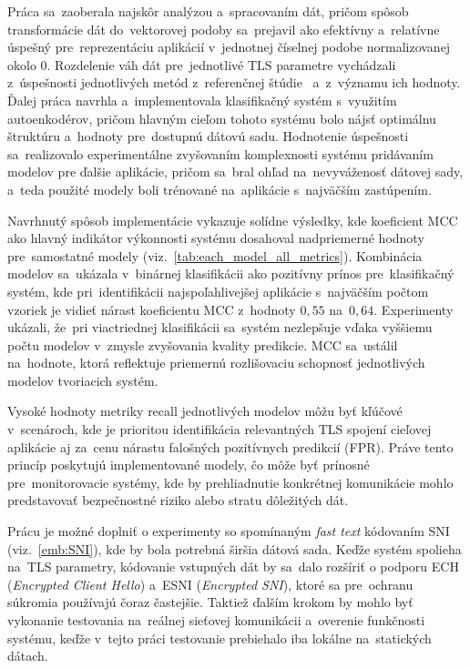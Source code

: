 Práca sa~zaoberala najskôr analýzou a~spracovaním dát, pričom spôsob transformácie dát do~vektorovej podoby sa~prejavil ako efektívny a~relatívne úspešný pre~reprezentáciu aplikácií v~jednotnej číselnej podobe normalizovanej okolo 0. Rozdelenie váh dát pre~jednotlivé TLS parametre vychádzali z~úspešnosti jednotlivých metód z~referenčnej štúdie~\cite{app_identification} a~z~významu ich hodnoty. Ďalej práca navrhla a~implementovala klasifikačný systém s~využitím autoenkodérov, pričom hlavným cieľom tohoto systému bolo nájsť optimálnu štruktúru a~hodnoty pre~dostupnú dátovú sadu. Hodnotenie úspešnosti sa~realizovalo experimentálne zvyšovaním komplexnosti systému pridávaním modelov pre ďalšie aplikácie, pričom sa~bral ohľad na~nevyváženosť dátovej sady, a~teda použité modely boli trénované na~aplikácie s~najväčším zastúpením. 

Navrhnutý spôsob implementácie vykazuje solídne výsledky, kde koeficient MCC ako hlavný indikátor výkonnosti systému dosahoval nadpriemerné hodnoty pre~samostatné modely (viz.~\ref{tab:each_model_all_metrics}). Kombinácia modelov sa~ukázala v~binárnej klasifikácii ako pozitívny prínos pre~klasifikačný systém, kde pri~identifikácii najspoľahlivejšej aplikácie s~najväčším počtom vzoriek je vidieť nárast koeficientu MCC z~hodnoty $0,55$ na~$0,64$. Experimenty ukázali, že~pri viactriednej klasifikácii sa~systém nezlepšuje vďaka vyššiemu počtu modelov v~zmysle zvyšovania kvality predikcie. MCC sa~ustálil na~hodnote, ktorá reflektuje priemernú rozlišovaciu schopnosť jednotlivých modelov tvoriacich systém.

Vysoké hodnoty metriky recall jednotlivých modelov môžu byť kľúčové v~scenároch, kde je prioritou identifikácia relevantných TLS spojení cieľovej aplikácie aj za~cenu nárastu falošných pozitívnych predikcií (FPR). Práve tento princíp poskytujú implementované modely, čo môže byť prínosné pre~monitorovacie systémy, kde by prehliadnutie konkrétnej komunikácie mohlo predstavovať bezpečnostné riziko alebo stratu dôležitých dát.

Prácu je možné doplniť o experimenty so spomínaným \textit{fast text} kódovaním SNI (viz.~\ref{emb:SNI}), kde by bola potrebná širšia dátová sada. Keďže systém spolieha na~TLS parametry, kódovanie vstupných dát by sa~dalo rozšíriť o podporu ECH (\textit{Encrypted Client Hello}) a~ESNI (\textit{Encrypted SNI}), ktoré sa pre~ochranu súkromia používajú čoraz častejšie. Taktiež ďalším krokom by mohlo byť vykonanie testovania na~reálnej sieťovej komunikácii a~overenie funkčnosti systému, keďže v~tejto práci testovanie prebiehalo iba lokálne na~statických dátach.\enlargethispage{\baselineskip}
